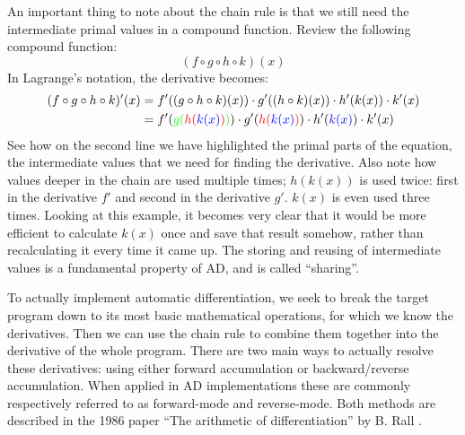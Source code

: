         An important thing to note about the chain rule is that we still need the intermediate primal values in a compound function.
        Review the following compound function:
        \[(f\circ g\circ h\circ k)(x)\]
        In Lagrange's notation, the derivative becomes:
        \begin{align*}
            (f\circ g\circ h\circ k)'(x)&=f'((g\circ h\circ k)(x))\cdot g'((h\circ k)(x))\cdot h'(k(x))\cdot k'(x)\\
            &=f'({\color{green}g({\color{red}h({\color{blue}k(x)})})})\cdot g'({\color{red}h({\color{blue}k(x)})})\cdot h'({\color{blue}k(x)})\cdot k'(x)
        \end{align*}
        See how on the second line we have highlighted the primal parts of the equation, the intermediate values that we need for finding the derivative.
        Also note how values deeper in the chain are used multiple times; $h(k(x))$ is used twice: first in the derivative $f'$ and second in the derivative $g'$.
        $k(x)$ is even used three times.
        Looking at this example, it becomes very clear that it would be more efficient to calculate $k(x)$ once and save that result somehow, rather than recalculating it every time it came up.
        The storing and reusing of intermediate values is a fundamental property of AD, and is called ``sharing''.

        To actually implement automatic differentiation, we seek to break the target program down to its most basic mathematical operations, for which we know the derivatives.
        Then we can use the chain rule to combine them together into the derivative of the whole program.
        There are two main ways to actually resolve these derivatives: using either forward accumulation or backward/reverse accumulation.
        When applied in AD implementations these are commonly respectively referred to as forward-mode and reverse-mode.
        Both methods are described in the 1986 paper ``The arithmetic of differentiation'' by B. Rall \cite{rall1986arithmetic}.
        
